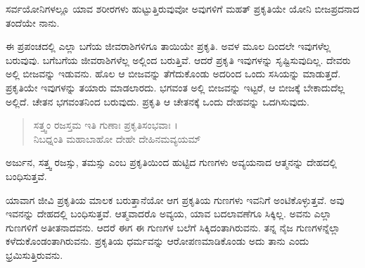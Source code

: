 {\small ಸರ್ವಯೋನಿಗಳಲ್ಲೂ ಯಾವ ಶರೀರಗಳು ಹುಟ್ಟುತ್ತಿರುವುವೋ ಅವುಗಳಿಗೆ ಮಹತ್ ಪ್ರಕೃತಿಯೇ ಯೋನಿ ಬೀಜಪ್ರದನಾದ ತಂದೆಯೇ ನಾನು.}

ಈ ಪ್ರಪಂಚದಲ್ಲಿ ಎಲ್ಲಾ ಬಗೆಯ ಜೀವರಾಶಿಗಳಿಗೂ ತಾಯಿಯೇ ಪ್ರಕೃತಿ. ಅವಳ ಮೂಲ ದಿಂದಲೇ ಇವುಗಳೆಲ್ಲ ಬರುವುವು. ಬಗೆಬಗೆಯ ಜೀವರಾಶಿಗಳೆಲ್ಲ ಅಲ್ಲಿಂದ ಬರುತ್ತಿವೆ. ಆದರೆ ಪ್ರಕೃತಿ ಇವುಗಳನ್ನು ಸೃಷ್ಟಿಸುವುದಿಲ್ಲ. ದೇವರು ಅಲ್ಲಿ ಬೀಜವನ್ನು ಇಡುವನು. ಹೊಲ ಆ ಬೀಜವನ್ನು ತೆಗೆದುಕೊಂಡು ಅದರಿಂದ ಒಂದು ಸಸಿಯನ್ನು ಮಾಡುತ್ತದೆ. ಪ್ರಕೃತಿಯೇ ಇವುಗಳನ್ನು ತಯಾರು ಮಾಡಲಾರದು. ಭಗವಂತ ಅಲ್ಲಿ ಬೀಜವನ್ನು ಇಟ್ಟರೆ, ಆ ಬೀಜಕ್ಕೆ ಬೇಕಾದುದೆಲ್ಲ ಅಲ್ಲಿದೆ. ಚೇತನ ಭಗವಂತನಿಂದ ಬರುವುದು. ಪ್ರಕೃತಿ ಆ ಚೇತನಕ್ಕೆ ಒಂದು ದೇಹವನ್ನು ಒದಗಿಸುವುದು.

\begin{verse}
ಸತ್ತ್ವಂ ರಜಸ್ತಮ ಇತಿ ಗುಣಾಃ ಪ್ರಕೃತಿಸಂಭವಾಃ ।\\ನಿಬಧ್ನಂತಿ ಮಹಾಬಾಹೋ ದೇಹೇ ದೇಹಿನಮವ್ಯಯಮ್ 
\end{verse}

{\small ಅರ್ಜುನ, ಸತ್ತ್ವ ರಜಸ್ಸು, ತಮಸ್ಸು ಎಂಬ ಪ್ರಕೃತಿಯಿಂದ ಹುಟ್ಟಿದ ಗುಣಗಳು ಅವ್ಯಯನಾದ ಆತ್ಮನನ್ನು ದೇಹದಲ್ಲಿ ಬಂಧಿಸುತ್ತವೆ.}

ಯಾವಾಗ ಜೀವಿ ಪ್ರಕೃತಿಯ ಮಾಲಕ ಬರುತ್ತಾನೆಯೋ ಆಗ ಪ್ರಕೃತಿಯ ಗುಣಗಳು ಇವನಿಗೆ ಅಂಟಿಕೊಳ್ಳುತ್ತವೆ. ಅವು ಇವನನ್ನು ದೇಹದಲ್ಲಿ ಬಂಧಿಸುತ್ತವೆ. ಆತ್ಮವಾದರೊ ಅವ್ಯಯ, ಯಾವ ಬದಲಾವಣೆಗೂ ಸಿಕ್ಕಿಲ್ಲ. ಅವನು ಎಲ್ಲಾ ಗುಣಗಳಿಗೆ ಅತೀತನಾದವನು. ಆದರೆ ಈಗ ಈ ಗುಣಗಳ ಬಲೆಗೆ ಸಿಕ್ಕಿದಂತಾಗಿರುವನು. ತನ್ನ ನೈಜ ಗುಣಗಳನ್ನೆಲ್ಲಾ ಕಳೆದುಕೊಂಡಂತಾಗಿರುವನು. ಪ್ರಕೃತಿಯ ಧರ್ಮವನ್ನು ಆರೋಪಣಮಾಡಿಕೊಂಡು ಅದು ತಾನು ಎಂದು ಭ್ರಮಿಸುತ್ತಿರುವನು.

